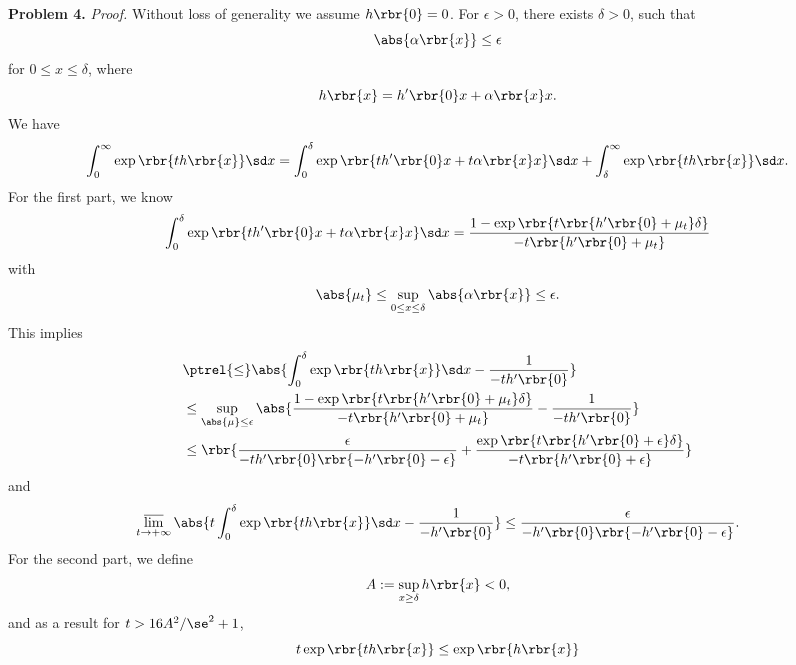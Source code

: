 \documentclass[english, nochinese]{pnote}
\begin{document}
\textbf{Problem 4.} \textit{Proof.} Without loss of generality we assume $ h \rbr{0} = 0 $. For $ \epsilon > 0 $, there exists $ \delta > 0 $, such that
\begin{equation}
\abs{ \alpha \rbr{x} } \le \epsilon
\end{equation}
for $ 0 \le x \le \delta $, where
\begin{equation}
h \rbr{x} = h' \rbr{0} x + \alpha \rbr{x} x.
\end{equation}
We have
\begin{equation}
\int_0^{\infty} \exp \rbr{ t h \rbr{x} } \sd x = \int_0^{\delta} \exp \rbr{ t h' \rbr{0} x + t \alpha \rbr{x} x } \sd x + \int_{\delta}^{\infty} \exp \rbr{ t h \rbr{x} } \sd x.
\end{equation}
For the first part, we know
\begin{equation}
\int_0^{\delta} \exp \rbr{ t h' \rbr{0} x + t \alpha \rbr{x} x } \sd x = \frac{ 1 - \exp \rbr{ t \rbr{ h' \rbr{0} + \mu_t } \delta }}{ -t \rbr{ h' \rbr{0} + \mu_t } }
\end{equation}
with
\begin{equation}
\abs{\mu_t} \le \sup_{ 0 \le x \le \delta } \abs{ \alpha \rbr{x} } \le \epsilon.
\end{equation}
This implies
\begin{equation}
\begin{split}
&\ptrel{\le} \abs{ \int_0^{\delta} \exp \rbr{ t h \rbr{x} } \sd x - \frac{1}{ -t h' \rbr{0} } } \\
&\le \sup_{ \abs{\mu} \le \epsilon } \abs{ \frac{ 1 - \exp \rbr{ t \rbr{ h' \rbr{0} + \mu_t } \delta }}{ -t \rbr{ h' \rbr{0} + \mu_t } } - \frac{1}{ -t h' \rbr{0} } } \\
&\le \rbr{ \frac{\epsilon}{ -t h' \rbr{0} \rbr{ -h' \rbr{0} - \epsilon } } + \frac{ \exp \rbr{ t \rbr{ h' \rbr{0} + \epsilon } \delta } }{ -t \rbr{ h' \rbr{0} + \epsilon } } }
\end{split}
\end{equation}
and
\begin{equation}
\varlimsup_{ t \rightarrow +\infty } \abs{ t \int_0^{\delta} \exp \rbr{ t h \rbr{x} } \sd x - \frac{1}{ -h' \rbr{0} } } \le \frac{\epsilon}{ -h' \rbr{0} \rbr{ -h' \rbr{0} - \epsilon } }.
\end{equation}
For the second part, we define
\begin{equation}
A := \sup_{ x \ge \delta } h \rbr{x} < 0,
\end{equation}
and as a result for $ t > 16 A^2 / \se^2 + 1 $,
\begin{equation}
t \exp \rbr{ t h \rbr{x} } \le \exp \rbr{ h \rbr{x} }
\end{equation}
\end{document}
